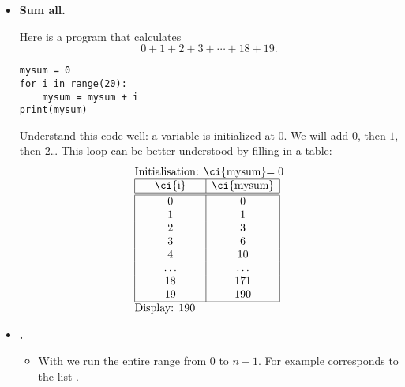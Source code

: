 \documentclass[11pt,class=report,crop=false]{standalone}
\begin{document}
\begin{cours}
\begin{itemize}
  \item \textbf{Sum all.}

Here is a program that calculates 
$$0+1+2+3+\cdots + 18 +19.$$

\begin{center}
\begin{minipage}{0.5\textwidth} 
\begin{lstlisting}
mysum = 0
for i in range(20):
    mysum = mysum + i
print(mysum)
\end{lstlisting}
\end{minipage}
\end{center} 

Understand this code well: a variable  is initialized at $0$. 
We will add $0$, then $1$, then $2$\ldots{}
This loop can be better understood by filling in a table:
  $$
  \begin{array}{l}
  \text{Initialisation: \ci{mysum}$=0$}    \\
  \begin{array}{|c|c|}
  \hline  
   \text{\ci{i}} &  \text{\ci{mysum}} \\
  \hline\hline
  0 & 0 \\  
  1 & 1 \\
  2 & 3 \\
  3 & 6 \\
  4 & 10\\
  \hspace*{5ex}\ldots\hspace*{5ex} & \hspace*{5ex}\ldots\hspace*{5ex} \\
  18 & 171 \\
  19 & 190 \\ 
  \hline
  \end{array} \\
  \text{Display: $190$}  
  \end{array} 
  $$ 
\end{itemize} 


\mybox
{ 
 \begin{minipage}{0.95\textwidth}
 \begin{itemize}
 \item \textbf{.}
	\begin{itemize}
	  \item With  we run the entire range from $0$ to $n-1$.
	  For example  corresponds to the list \ci{[0, 1, 2, 3, 4, 5, 6, 7, 8, 9]}. 
	  

\end{itemize}
\end{itemize}
\end{minipage}}
\end{cours}
\end{document}
